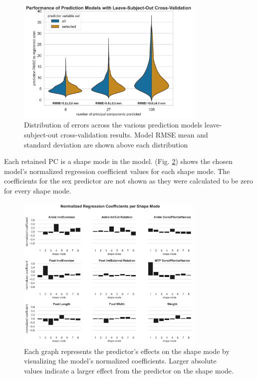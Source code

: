 \documentclass[defaultstyle,11pt]{comps}
\begin{document}
\begin{figure}
\hypertarget{fig:modelperf}{%
\centering
\includegraphics[width=0.8\textwidth,height=\textheight]{../fig/SA2/modelPerformance.png}
\caption{Distribution of errors across the various prediction models leave-subject-out cross-validation results. Model RMSE mean and standard deviation are shown above each distribution}\label{fig:modelperf}
}
\end{figure}

Each retained PC is a shape mode in the model. (Fig. \ref{fig:coefs}) shows the chosen model's normalized regression coefficient values for each shape mode.
The coefficients for the sex predictor are not shown as they were calculated to be zero for every shape mode.

\begin{figure}
\hypertarget{fig:coefs}{%
\centering
\includegraphics[width=0.8\textwidth,height=\textheight]{../fig/SA2/coefs.png}
\caption{Each graph represents the predictor's effects on the shape mode by visualizing the model's normalized coefficients. Larger absolute values indicate a larger effect from the predictor on the shape mode.}\label{fig:coefs}
}
\end{figure}
\end{document}
